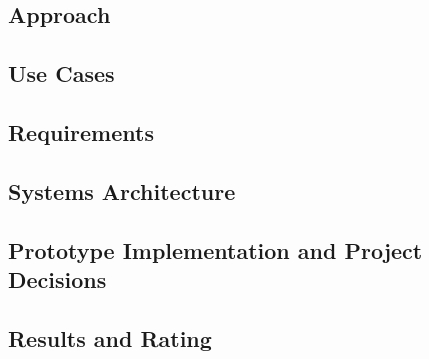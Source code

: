 \subsection{Approach}
\subsection{Use Cases}

\subsection{Requirements}
\subsection{Systems Architecture}
\subsection{Prototype Implementation and Project Decisions}
\subsection{Results and Rating}
